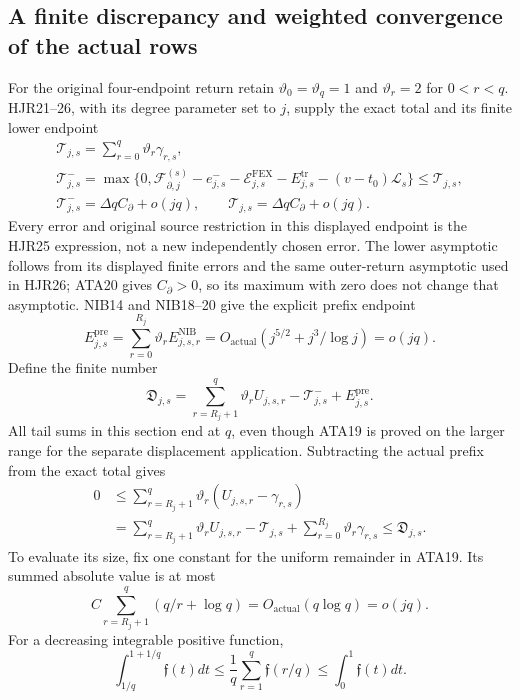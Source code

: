 \documentclass[11pt,a4paper]{article}
\begin{document}
\subsection{A finite discrepancy and weighted convergence of the actual rows}
For the original four-endpoint return retain
$\vartheta_0=\vartheta_q=1$ and $\vartheta_r=2$ for $0<r<q$.
HJR21--26, with its degree parameter set to $j$, supply the exact
total and its finite lower endpoint
\[
\begin{gathered}
 \mathcal T_{j,s}=\sum_{r=0}^q\vartheta_r\gamma_{r,s},\\
 \mathcal T^-_{j,s}
 =\max\{0,\mathcal F_{\partial,j}^{(s)}-e^-_{j,s}
       -\mathcal E^{\mathrm{FEX}}_{j,s}-E^{\mathrm{tr}}_{j,s}
       -(v-t_0)\mathcal L_s\}\le\mathcal T_{j,s},\\
 \mathcal T^-_{j,s}=\Delta qC_\partial+o(jq),\qquad
 \mathcal T_{j,s}=\Delta qC_\partial+o(jq).
\end{gathered}\tag{ATA21}
\]
Every error and original source restriction in this displayed endpoint
is the HJR25 expression, not a new independently chosen error.
The lower asymptotic follows from its displayed finite errors and the
same outer-return asymptotic used in HJR26; ATA20 gives $C_\partial>0$,
so its maximum with zero does not change that asymptotic.
NIB14 and NIB18--20 give the explicit prefix endpoint
\[
 E^{\mathrm{pre}}_{j,s}
 =\sum_{r=0}^{R_j}\vartheta_rE^{\mathrm{NIB}}_{j,s,r}
 =O_{\mathrm{actual}}(j^{5/2}+j^3/\log j)=o(jq).         \tag{ATA22}
\]
Define the finite number
\[
 \mathfrak D_{j,s}
 =\sum_{r=R_j+1}^q\vartheta_rU_{j,s,r}
                       -\mathcal T^-_{j,s}+E^{\mathrm{pre}}_{j,s}.
                                                               \tag{ATA23}
\]
All tail sums in this section end at $q$, even though ATA19 is proved
on the larger range for the separate displacement application.
Subtracting the actual prefix from the exact total gives
\[
\begin{split}
 0&\le\sum_{r=R_j+1}^q\vartheta_r(U_{j,s,r}-\gamma_{r,s})\\
  &=\sum_{r=R_j+1}^q\vartheta_rU_{j,s,r}
    -\mathcal T_{j,s}
    +\sum_{r=0}^{R_j}\vartheta_r\gamma_{r,s}
 \le\mathfrak D_{j,s}.
\end{split}\tag{ATA24}
\]
To evaluate its size, fix one constant for the uniform remainder
in ATA19.  Its summed absolute value is at most
\[
 C\sum_{r=R_j+1}^q(q/r+\log q)=O_{\mathrm{actual}}(q\log q)=o(jq).
\]
For a decreasing integrable positive function,
\[
 \int_{1/q}^{1+1/q}\mathfrak f(t)dt
 \le\frac1q\sum_{r=1}^q\mathfrak f(r/q)
 \le\int_0^1\mathfrak f(t)dt.
\]
\end{document}
